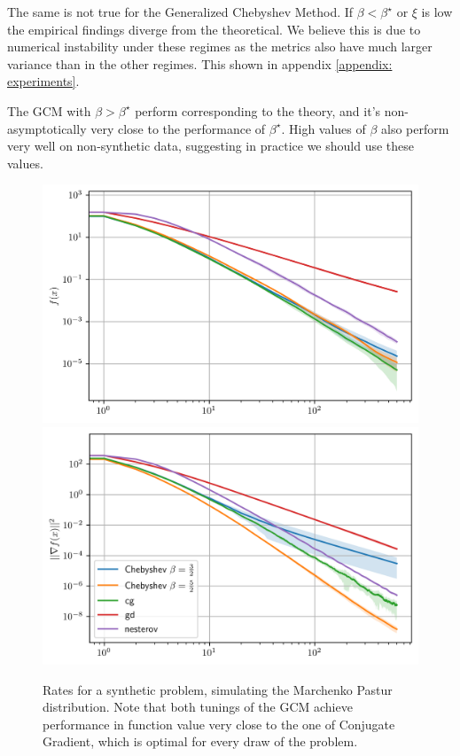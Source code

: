 \documentclass{article}
\begin{document}
The same is not true for the Generalized Chebyshev Method. If $\beta<\beta^\star$ or $\xi$ is low the empirical findings diverge from the theoretical. We believe this is due to numerical instability under these regimes as the metrics also have  much larger variance than in the other regimes. This shown in appendix \ref{appendix: experiments}.  


The GCM with  $\beta>\beta^\star$ perform corresponding to the theory, and it's non-asymptotically very close to the performance of $\beta^\star$. High values of $\beta$ also perform very well on non-synthetic data, suggesting in practice we should use these values.


\begin{figure}[h]
    \centering
    \includegraphics[width=5 cm]{new_imgs/mp f.png}\includegraphics[width= 5 cm]{new_imgs/mp grad.png}
    
    
    \caption{Rates for a synthetic problem, simulating the Marchenko Pastur distribution. Note that both tunings of the GCM achieve performance in function value very close to the one of Conjugate Gradient, which is optimal for every draw of the problem.}
    \label{fig: mp performance}
\end{figure}
\end{document}
